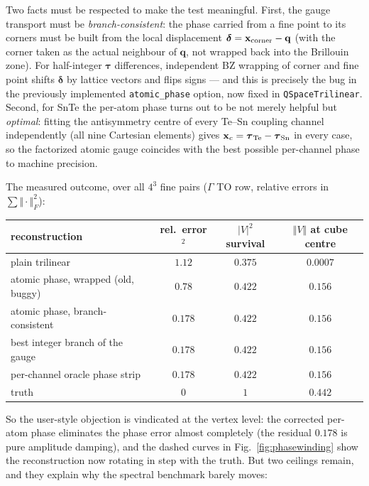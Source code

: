 \documentclass[11pt,a4paper]{article}
\newcommand{\qv}{\mathbf{q}}
\begin{document}
Two facts must be respected to make the test meaningful.  First, the
gauge transport must be \emph{branch-consistent}: the phase carried
from a fine point to its corners must be built from the local
displacement $\boldsymbol\delta = \mathbf x_{\rm corner}-\qv$ (with
the corner taken as the actual neighbour of $\qv$, not wrapped back
into the Brillouin zone).  For half-integer $\boldsymbol\tau$
differences, independent BZ wrapping of corner and fine point shifts
$\boldsymbol\delta$ by lattice vectors and flips signs --- and this
is precisely the bug in the previously implemented
\texttt{atomic\_phase} option, now fixed in
\texttt{QSpaceTrilinear}.  Second, for SnTe the per-atom phase turns
out to be not merely helpful but \emph{optimal}: fitting the
antisymmetry centre of every Te--Sn coupling channel independently
(all nine Cartesian elements) gives $\mathbf x_c =
\boldsymbol\tau_{\rm Te}-\boldsymbol\tau_{\rm Sn}$ in every case, so
the factorized atomic gauge coincides with the best possible
per-channel phase to machine precision.

The measured outcome, over all $4^3$ fine pairs ($\Gamma$ TO row,
relative errors in $\sum\Vert\cdot\Vert_F^2$):

\begin{center}
\begin{tabular}{lccc}
\toprule
reconstruction & rel.\ error$^2$ & $|V|^2$ survival &
$\Vert V\Vert$ at cube centre \\
\midrule
plain trilinear & $1.12$ & $0.375$ & $0.0007$ \\
atomic phase, wrapped (old, buggy) & $0.78$ & $0.422$ & $0.156$ \\
atomic phase, branch-consistent & $\mathbf{0.178}$ & $0.422$ & $0.156$ \\
best integer branch of the gauge & $0.178$ & $0.422$ & $0.156$ \\
per-channel oracle phase strip & $0.178$ & $0.422$ & $0.156$ \\
\midrule
truth & $0$ & $1$ & $0.442$ \\
\bottomrule
\end{tabular}
\end{center}

So the user-style objection is vindicated at the vertex level: the
corrected per-atom phase eliminates the phase error almost completely
(the residual $0.178$ is pure amplitude damping), and the dashed
curves in Fig.~\ref{fig:phasewinding} show the reconstruction now
rotating in step with the truth.  But two ceilings remain, and they
explain why the spectral benchmark barely moves:
\end{document}
